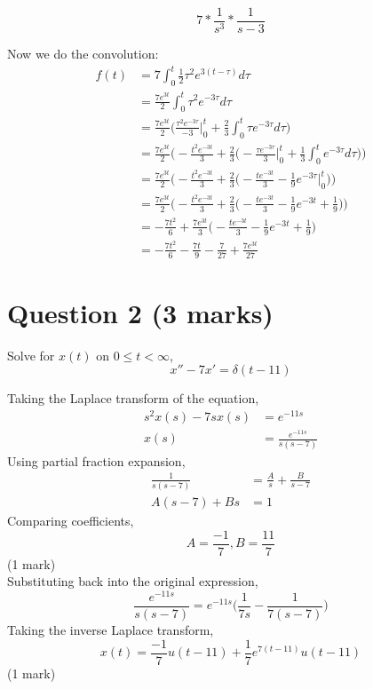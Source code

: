 \documentclass[12pt]{article}
\begin{document}
$$7 * \frac{1}{s^3} * \frac{1}{s-3}$$

\noindent Now we do the convolution:
\begin{align*}
    f(t) &= 7 \int_0^{t} \frac{1}{2}\tau^2e^{3(t - \tau)} d\tau
      \\ &= \frac{7e^{3t}}{2} \int_0^t \tau^2e^{-3\tau} d\tau
      \\ &= \frac{7e^{3t}}{2}
        \bigg(\frac{\tau^2e^{-3\tau}}{-3} \bigg|_0^t
        + \frac{2}{3} \int_0^t \tau e^{-3\tau} d\tau \bigg)
      \\ &= \frac{7e^{3t}}{2} \bigg(-\frac{t^2e^{-3t}}{3}
        + \frac{2}{3} \bigg(-\frac{\tau e^{-3\tau}}{3} \bigg|_0^t
        + \frac{1}{3} \int_0^t e^{-3\tau} d\tau \bigg) \bigg)
      \\ &= \frac{7e^{3t}}{2} \bigg(-\frac{t^2e^{-3t}}{3}
        + \frac{2}{3} \bigg(-\frac{te^{-3t}}{3}
        - \frac{1}{9} e^{-3\tau} \bigg|_0^t \bigg) \bigg)
      \\ &= \frac{7e^{3t}}{2} \bigg(-\frac{t^2e^{-3t}}{3}
        + \frac{2}{3} \bigg(-\frac{te^{-3t}}{3}
        - \frac{1}{9} e^{-3t} + \frac{1}{9} \bigg) \bigg)
      \\ &= -\frac{7t^2}{6}
        + \frac{7e^{3t}}{3} \bigg(-\frac{te^{-3t}}{3}
        - \frac{1}{9} e^{-3t} + \frac{1}{9} \bigg)
      \\ &= -\frac{7t^2}{6} -\frac{7t}{9}
        - \frac{7}{27} + \frac{7e^{3t}}{27}
\end{align*}

\section*{Question 2 (3 marks)}
Solve for $x(t)$ on $0 \leq t < \infty$, $$x''-7x'=\delta(t-11)$$

\noindent Taking the Laplace transform of the equation,
\begin{align*}
  s^2x(s) - 7sx(s) &= e^{-11s} \\
  x(s) &= \frac{e^{-11s}}{s(s-7)} \tag{1 mark}
\end{align*}
Using partial fraction expansion,
\begin{align*}
  \frac{1}{s(s-7)} &= \frac{A}{s} + \frac{B}{s-7} \\
  A(s-7) + Bs &= 1
\end{align*}
Comparing coefficients, $$A=\frac{-1}{7}, B=\frac{11}{7}$$\hfill(1 mark) \\ Substituting back into the original expression, $$\frac{e^{-11s}}{s(s-7)} = e^{-11s}\bigg(\frac{1}{7s} - \frac{1}{7(s-7)}\bigg)$$ Taking the inverse Laplace transform, $$x(t)=\frac{-1}{7}u(t-11) + \frac{1}{7}e^{7(t-11)}u(t-11)$$\hfill(1 mark)
\end{document}
